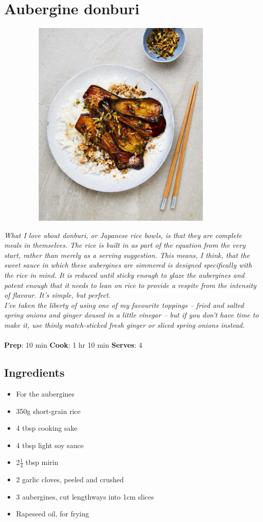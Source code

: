 \documentclass{book}
\begin{document}
\section{Aubergine donburi}
\begin{figure}
\centering\includegraphics[width=10cm,height=10cm,keepaspectratio]{Recipe_Pictures/Aubergine_donburi.png}
\end{figure}
\emph{What I love about donburi, or Japanese rice bowls, is that they are complete meals in themselves. The rice is built in as part of the equation from the very start, rather than merely as a serving suggestion. This means, I think, that the sweet sauce in which these aubergines are simmered is designed specifically with the rice in mind. It is reduced until sticky enough to glaze the aubergines and potent enough that it needs to lean on rice to provide a respite from the intensity of flavour. It’s simple, but perfect.\\ 
I’ve taken the liberty of using one of my favourite toppings – fried and salted spring onions and ginger doused in a little vinegar – but if you don’t have time to make it, use thinly match-sticked fresh ginger or sliced spring onions instead.}\\\\ 
\textbf{Prep}: 10 min
\textbf{Cook}: 1 hr 10 min
\textbf{Serves}: 4
\subsection*{Ingredients}
\begin{itemize}
\item For the aubergines
\item 350g short-grain rice
\item 4 tbsp cooking sake
\item 4 tbsp light soy sauce
\item 2$\frac{1}{4}$ tbsp mirin
\item 2 garlic cloves, peeled and crushed
\item 3 aubergines, cut lengthways into 1cm slices
\item Rapeseed oil, for frying
\end{itemize}
\end{document}
